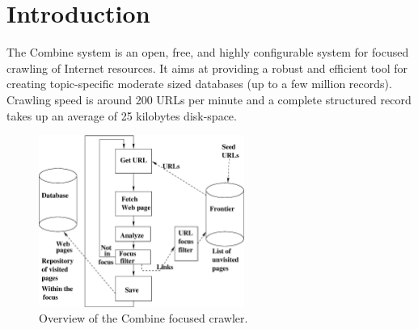 \section{Introduction}


The Combine system is an open, free, and highly configurable
system for focused crawling of Internet resources.
It aims at providing a robust and efficient tool for creating
topic-specific moderate sized databases (up to a few million records).
Crawling speed is around 200 URLs per minute and a complete structured
record takes up an average of 25 kilobytes disk-space.

\begin{figure}[htb]
\begin{center}
 \includegraphics[height=0.3\textheight, width=0.6\textwidth]{focusedrobot.eps}
\end{center}
\caption{Overview of the Combine focused crawler.}
\label{overview}
\end{figure}

